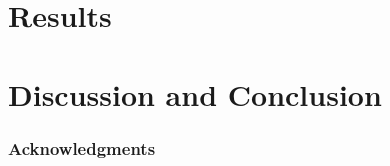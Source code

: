 \documentclass{article} %
\begin{document}

\section{Results}

\section{Discussion and Conclusion}

\subsubsection*{Acknowledgments}



\end{document}

